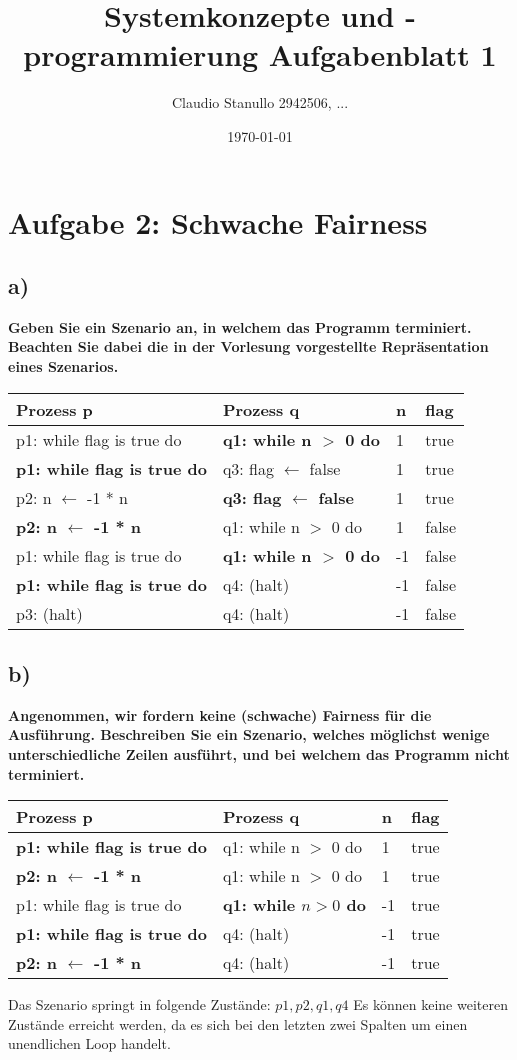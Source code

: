 \documentclass[12pt,pdftex,a4paper]{article}
\title{Systemkonzepte und -programmierung  Aufgabenblatt 1}
\author{Claudio Stanullo 2942506, ...}
\date{\today}
\begin{document}
\maketitle
\section*{Aufgabe 2: Schwache Fairness}
\subsection*{a)}
\textbf{Geben Sie ein Szenario an, in welchem das Programm terminiert. Beachten
Sie dabei die in der Vorlesung vorgestellte Repräsentation eines Szenarios.}\newline\newline
\begin{tabular}[c]{|l|l|l|l|}
\hline
Prozess p&Prozess q&n&flag\\
\hline
p1: while flag is true do&\textbf{q1: while n $>$ 0 do}&1&true\\
\textbf{p1: while flag is true do} &q3: flag $\leftarrow$ false&1&true\\
p2: n $\leftarrow$ -1 * n &\textbf{q3: flag $\leftarrow$ false}&1&true\\
\textbf{p2: n $\leftarrow$ -1 * n}&q1: while n $>$ 0 do&1&false\\
p1: while flag is true do&\textbf{q1: while n $>$ 0 do}&-1&false\\
\textbf{p1: while flag is true do}&q4: (halt)&-1&false\\
p3: (halt)&q4: (halt)&-1&false\\
\hline
\end{tabular}
\subsection*{b)}
\textbf{Angenommen, wir fordern keine (schwache) Fairness für die Ausführung.
Beschreiben Sie ein Szenario, welches möglichst wenige unterschiedliche Zeilen ausführt,
und bei welchem das Programm nicht terminiert.}\newline\newline
\begin{tabular}[c]{|l|l|l|l|}
\hline
Prozess p&Prozess q&n&flag\\
\hline
\textbf{p1: while flag is true do}&q1: while n $>$ 0 do&1&true\\
\textbf{p2: n $\leftarrow$ -1 * n}&q1: while n $>$ 0 do&1&true\\
p1: while flag is true do&\textbf{q1: while $n > 0$ do}&-1&true\\
\textbf{p1: while flag is true do}&q4: (halt)&-1&true\\
\textbf{p2: n $\leftarrow$ -1 * n}&q4: (halt)&-1&true\\
\hline
\end{tabular}\newline\newline
Das Szenario springt in folgende Zustände:\newline
$p1, p2, q1, q4$\newline
Es können keine weiteren Zustände erreicht werden, da es sich bei den letzten zwei Spalten um einen unendlichen Loop handelt.
\end{document}

